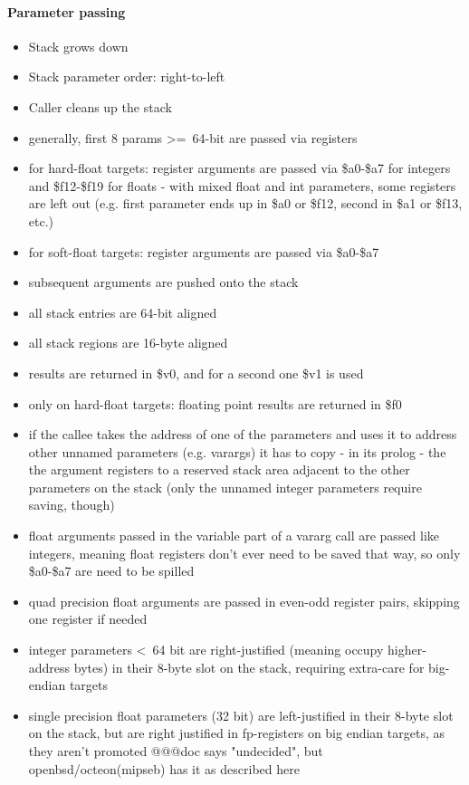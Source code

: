 \paragraph{Parameter passing}

\begin{itemize}
\item Stack grows down
\item Stack parameter order: right-to-left
\item Caller cleans up the stack
\item generally, first 8 params \textgreater=\ 64-bit are passed via registers
\item for hard-float targets: register arguments are passed via \$a0-\$a7 for integers and \$f12-\$f19 for floats - with mixed float and int parameters, some registers are left out (e.g. first parameter ends up in \$a0 or \$f12, second in \$a1 or \$f13, etc.)
\item for soft-float targets: register arguments are passed via \$a0-\$a7
\item subsequent arguments are pushed onto the stack
\item all stack entries are 64-bit aligned
\item all stack regions are 16-byte aligned
\item results are returned in \$v0, and for a second one \$v1 is used
\item only on hard-float targets: floating point results are returned in \$f0
\item if the callee takes the address of one of the parameters and uses it to address other unnamed parameters (e.g. varargs) it has to copy - in its prolog - the the argument registers to a reserved stack area adjacent to the other parameters on the stack (only the unnamed integer parameters require saving, though) %
\item float arguments passed in the variable part of a vararg call are passed like integers, meaning float registers don't ever need to be saved that way, so only \$a0-\$a7 are need to be spilled
\item quad precision float arguments are passed in even-odd register pairs, skipping one register if needed
\item integer parameters \textless\ 64 bit are right-justified (meaning occupy higher-address bytes) in their 8-byte slot on the stack, requiring extra-care for big-endian targets
\item single precision float parameters (32 bit) are left-justified in their 8-byte slot on the stack, but are right justified in fp-registers on big endian targets, as they aren't promoted @@@doc says "undecided", but openbsd/octeon(mipseb) has it as described here
\end{itemize}

